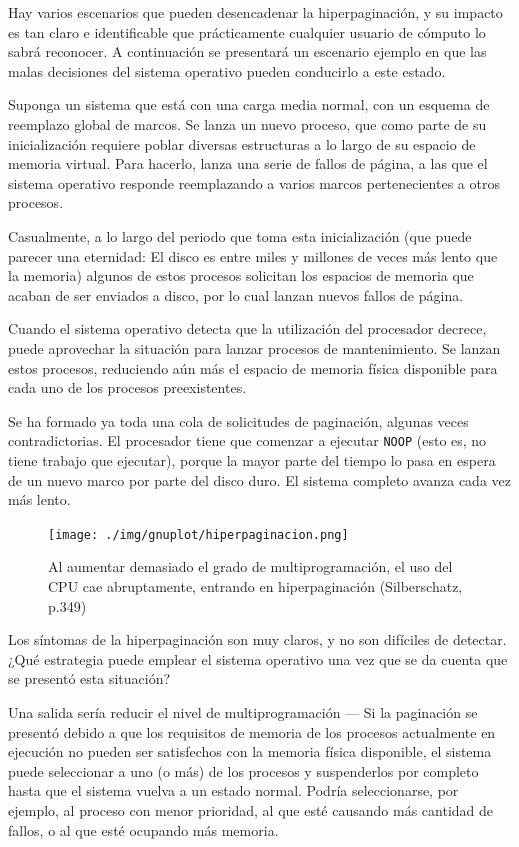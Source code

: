 \documentclass[11pt,fleqn]{book} %
\begin{document}
Hay varios escenarios que pueden desencadenar la hiperpaginación, y
su impacto es tan claro e identificable que prácticamente cualquier
usuario de cómputo lo sabrá reconocer. A continuación se presentará un
escenario ejemplo en que las malas decisiones del sistema operativo
pueden conducirlo a este estado.

Suponga un sistema que está con una carga media normal, con un
esquema de reemplazo global de marcos. Se lanza un nuevo proceso, que
como parte de su inicialización requiere poblar diversas estructuras a
lo largo de su espacio de memoria virtual. Para hacerlo, lanza una
serie de fallos de página, a las que el sistema operativo responde
reemplazando a varios marcos pertenecientes a otros procesos.

Casualmente, a lo largo del periodo que toma esta inicialización
(que puede parecer una eternidad: El disco es entre miles y
millones de veces más lento que la memoria) algunos de estos procesos
solicitan los espacios de memoria que acaban de ser enviados a disco,
por lo cual lanzan nuevos fallos de página.

Cuando el sistema operativo detecta que la utilización del procesador decrece,
puede aprovechar la situación para lanzar procesos de mantenimiento. 
Se lanzan estos procesos, reduciendo aún más el espacio de memoria física 
disponible para cada uno de los procesos preexistentes.

Se ha formado ya toda una cola de solicitudes de paginación, algunas
veces contradictorias. El procesador tiene que comenzar a ejecutar
\texttt{NOOP} (esto es, no tiene trabajo que ejecutar), porque la mayor
parte del tiempo lo pasa en espera de un nuevo marco por parte del
disco duro. El sistema completo avanza cada vez más lento.

\begin{figure}[htb]
\centering
\texttt{[image: ./img/gnuplot/hiperpaginacion.png]}
\caption{\label{MEM_hiperpaginacion}Al aumentar demasiado el grado de multiprogramación, el uso del CPU cae abruptamente, entrando en hiperpaginación  (Silberschatz, p.349)}
\end{figure}

Los síntomas de la hiperpaginación son muy claros, y no son difíciles
de detectar. ¿Qué estrategia puede emplear el sistema operativo una
vez que se da cuenta que se presentó esta situación?

Una salida sería reducir el nivel de multiprogramación — Si la
paginación se presentó debido a que los requisitos de memoria de los
procesos actualmente en ejecución no pueden ser satisfechos con la
memoria física disponible, el sistema puede seleccionar a uno (o más)
de los procesos y suspenderlos por completo hasta que el sistema
vuelva a un estado normal. Podría seleccionarse, por ejemplo, al
proceso con menor prioridad, al que esté causando más cantidad de
fallos, o al que esté ocupando más memoria.
\end{document}
